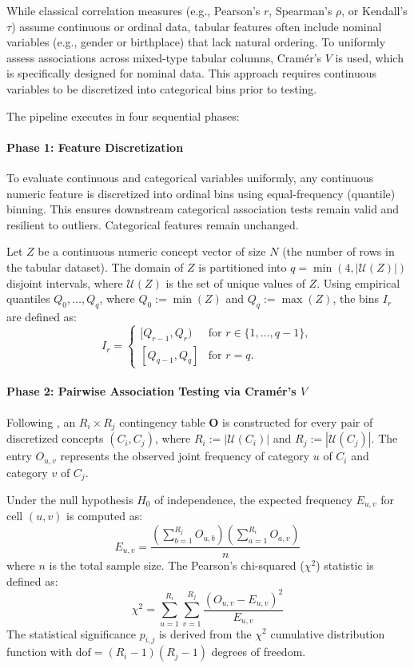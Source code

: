 While classical correlation measures (e.g., Pearson's $r$, Spearman's $\rho$, or Kendall's $\tau$) assume continuous or ordinal data, tabular features often include nominal variables (e.g., gender or birthplace) that lack natural ordering. To uniformly assess associations across mixed-type tabular columns, Cramér's $V$ is used, which is specifically designed for nominal data. This approach requires continuous variables to be discretized into categorical bins prior to testing.

The pipeline executes in four sequential phases:

\paragraph{Phase 1: Feature Discretization}
To evaluate continuous and categorical variables uniformly, any continuous numeric feature is discretized into ordinal bins using equal-frequency (quantile) binning. This ensures downstream categorical association tests remain valid and resilient to outliers. Categorical features remain unchanged.

Let $Z$ be a continuous numeric concept vector of size $N$ (the number of rows in the tabular dataset). The domain of $Z$ is partitioned into $q = \min(4, |\mathcal{U}(Z)|)$ disjoint intervals, where $\mathcal{U}(Z)$ is the set of unique values of $Z$. Using empirical quantiles $Q_0, \dots, Q_q$, where $Q_0 := \min(Z)$ and $Q_q := \max(Z)$, the bins $I_r$ are defined as:
\[
I_r =
\begin{cases}
[Q_{r-1}, Q_r) & \text{for } r \in \{1, \dots, q-1\}, \\[2pt]
[Q_{q-1}, Q_q] & \text{for } r = q.
\end{cases}
\]

\paragraph{Phase 2: Pairwise Association Testing via Cramér's $V$}
Following \cite{ben-shacharPhiFeiFo2023}, an $R_i \times R_j$ contingency table $\mathbf{O}$ is constructed for every pair of discretized concepts $(C_i, C_j)$, where $R_i := |\mathcal{U}(C_i)|$ and $R_j := |\mathcal{U}(C_j)|$. The entry $O_{u,v}$ represents the observed joint frequency of category $u$ of $C_i$ and category $v$ of $C_j$.

Under the null hypothesis $H_0$ of independence, the expected frequency $E_{u,v}$ for cell $(u,v)$ is computed as:
\[
E_{u,v} = \frac{\left( \sum_{b=1}^{R_j} O_{u,b} \right) \left( \sum_{a=1}^{R_i} O_{a,v} \right)}{n}
\]
where $n$ is the total sample size. The Pearson's chi-squared ($\chi^2$) statistic is defined as:
\[
\chi^2 = \sum_{u=1}^{R_i} \sum_{v=1}^{R_j} \frac{(O_{u,v} - E_{u,v})^2}{E_{u,v}}
\]
The statistical significance $p_{i,j}$ is derived from the $\chi^2$ cumulative distribution function with $\text{dof} = (R_i - 1)(R_j - 1)$ degrees of freedom.

